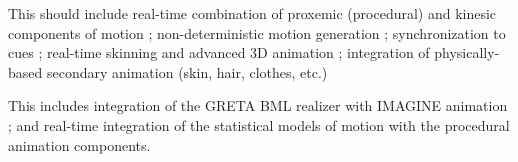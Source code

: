This should include real-time combination of proxemic (procedural) and kinesic components of motion ; non-deterministic motion generation ; synchronization to cues ; real-time skinning and advanced 3D animation ; integration of physically-based secondary animation (skin, hair, clothes, etc.)

This includes integration of the GRETA BML realizer with IMAGINE animation ; and real-time integration of the statistical models of motion with the procedural animation components.




\endinput
